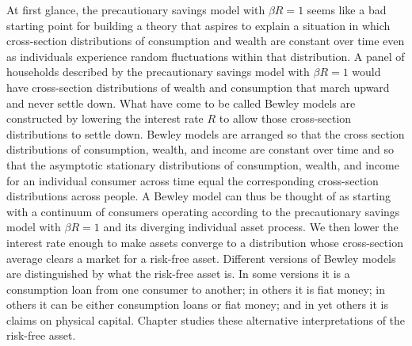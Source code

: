 At first glance,
the precautionary savings model with $\beta R=1$ seems like
a bad starting point
for building a theory
that aspires to explain a situation in which cross-section distributions
of consumption and wealth are constant over time even as individuals
experience random fluctuations within that distribution.
  A panel of households described by the precautionary savings model with
$\beta R =1$ would  have cross-section distributions  of wealth
and consumption that march upward and never settle down. What
have come to be called Bewley models are constructed by lowering
the interest rate $R$ to allow those cross-section distributions
to settle down.
 Bewley models are arranged so that the cross
section distributions of consumption, wealth, and income are
constant over time and so that  the asymptotic stationary
distributions of consumption, wealth, and income for an individual
consumer across time equal the corresponding cross-section
distributions across people.
 A Bewley model can thus
be thought of as starting with a continuum of consumers operating according to the
precautionary savings model with $\beta R=1$ and its diverging
individual asset process. We then lower the interest rate enough
to make assets converge to a distribution whose cross-section
average clears  a market for a risk-free asset.   Different
versions of Bewley  models are distinguished by what the risk-free
asset is. In some versions it is a consumption loan from one
consumer to another; in others it is fiat money; in others it can
be either consumption loans or fiat money; and in yet others it is
claims on physical capital.  Chapter  studies
these alternative interpretations of the risk-free asset.




